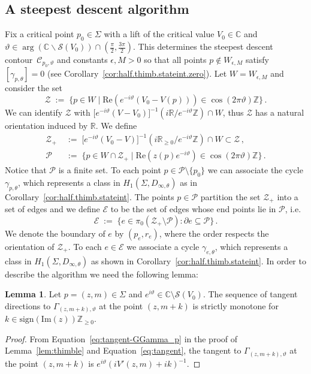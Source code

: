 \documentclass[12pt,reqno]{amsart}
\theoremstyle{definition}
\newtheorem{lemma}[theorem]{Lemma}
\def\BZ{\mathbb Z}
\def\BR{\mathbb R}
\def\BC{\mathbb C}
\def\calC{\mathcal C}
\def\calE{\mathcal E}
\def\calP{\mathcal P}
\def\calS{\mathcal S}
\def\calZ{\mathcal Z}
\def\Re{\mathrm{Re}}
\def\Im{\mathrm{Im}}
\def\be{\begin{equation}}
\def\ee{\end{equation}}
\renewcommand{\=}{\;=\;}
\begin{document}
\subsection{A steepest descent algorithm}\label{sec:alg}
Fix a critical point $p_0\in\Sigma$ with a lift of the critical value $V_0\in\BC$ and $\vartheta\in\arg(\BC\backslash\calS(V_{0}))\cap(\tfrac{\pi}{2},\tfrac{3\pi}{2})$. This determines the steepest descent contour~$\calC_{p_0,\vartheta}$ and constants $\epsilon,M>0$ so that all points $p\notin W_{\epsilon,M}$ satisfy $[\gamma_{p,\theta}]=0$ (see Corollary~\ref{cor:half.thimb.stateint.zero}). Let $W=W_{\epsilon,M}$ and consider the set
\be
\calZ\;:=\;\{p\in W\;|\;\Re(e^{-i\vartheta}(V_0-V(p)))\in\cos(2\pi\vartheta)\BZ\}\,.
\ee
We can identify $\calZ$ with $\big[e^{-i\vartheta}(V-V_0)\big]^{-1}(i\BR/e^{-i\vartheta}\BZ)\cap W$, thus $\calZ$ has a natural orientation induced by $\BR$. We define 
\be
\begin{aligned}
\calZ_+&\;:=\;\big[e^{-i\vartheta}(V_0-V)\big]^{-1}(i\BR_{\geq 0}/e^{-i\vartheta}\BZ)\cap W\subset\calZ\,,\\
\calP&\;:=\;\{p\in W\cap\calZ_+ \;\vert\; \Re(z(p)e^{-i\vartheta})\in\cos(2\pi\vartheta)\BZ\}\,.
\end{aligned}
\ee
Notice that $\calP$ is a finite set. To each point $p\in\calP\setminus\{p_0\}$ we can associate the cycle $\gamma_{p,\theta}$, which represents a class in $H_1(\Sigma,D_{\infty,\theta})$ as in Corollary~\ref{cor:half.thimb.stateint}. The points $p\in\calP$ partition the set $\calZ_+$ into a set of edges and we define $\calE$ to be the set of edges whose end points lie in $\calP$, i.e. 
\be
\calE\;:=\;\big\{e\in\pi_0(\calZ_+\setminus\calP)\colon \partial e\subseteq\calP\big\}\,.
\ee
We denote the boundary of $e$ by $(p_e, r_e)$, where the order respects the orientation of $\calZ_+$. To each $e\in\calE$ we associate a cycle $\gamma_{e,\theta}$, which represents a class in $H_1(\Sigma,D_{\infty,\theta})$ as shown in Corollary~\ref{cor:half.thimb.stateint}. 
In order to describe the algorithm we need the following lemma:
\begin{lemma}\label{lem:}
Let $p=(z,m)\in\Sigma$ and $e^{i\vartheta}\in\BC\setminus\calS(V_0)$. The sequence of tangent directions to $\Gamma_{(z,m+k),\vartheta}$ at the point $(z,m+k)$ is strictly monotone for $k\in\mathrm{sign}(\Im(z))\BZ_{\geq 0}$.%
\end{lemma}
\begin{proof}
From Equation~\eqref{eq:tangent-GGamma_p} in the proof of Lemma~\ref{lem:thimble} and Equation~\eqref{eq:tangent}, the tangent to $\Gamma_{(z,m+k),\vartheta}$ at the point $(z,m+k)$ is $e^{i\vartheta}(iV'(z,m)+ik)^{-1}$. 
\end{proof}
\end{document}
